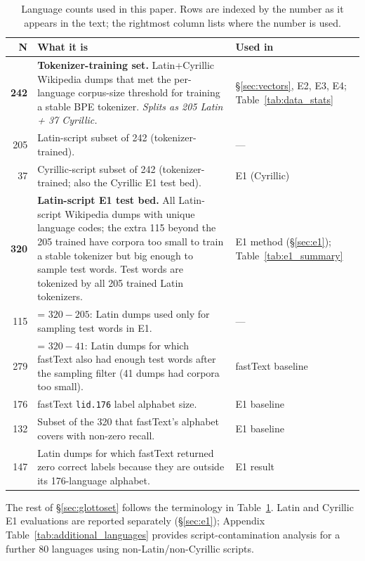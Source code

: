 \documentclass[11pt]{article}
\begin{document}
\begin{table}[ht]
\caption{Language counts used in this paper. Rows are indexed by the number as it appears in the text; the rightmost column lists where the number is used.}
\label{tab:language_counts}
\centering
\small
\renewcommand{\arraystretch}{1.15}
\begin{tabular}{@{}rp{5.2cm}l@{}}
\toprule
\textbf{N} & \textbf{What it is} & \textbf{Used in} \\
\midrule
\textbf{242} & \textbf{Tokenizer-training set.} Latin+Cyrillic Wikipedia dumps that met the per-language corpus-size threshold for training a stable BPE tokenizer. \emph{Splits as 205 Latin + 37 Cyrillic.} & \S\ref{sec:vectors}, E2, E3, E4; Table~\ref{tab:data_stats} \\
205 & Latin-script subset of 242 (tokenizer-trained). & — \\
37 & Cyrillic-script subset of 242 (tokenizer-trained; also the Cyrillic E1 test bed). & E1 (Cyrillic) \\
\textbf{320} & \textbf{Latin-script E1 test bed.} All Latin-script Wikipedia dumps with unique language codes; the extra 115 beyond the 205 trained have corpora too small to train a stable tokenizer but big enough to sample test words. Test words are tokenized by all 205 trained Latin tokenizers. & E1 method (\S\ref{sec:e1}); Table~\ref{tab:e1_summary} \\
115 & = $320-205$: Latin dumps used only for sampling test words in E1. & — \\
279 & = $320-41$: Latin dumps for which fastText also had enough test words after the sampling filter (41 dumps had corpora too small). & fastText baseline \\
176 & fastText \texttt{lid.176} label alphabet size. & E1 baseline \\
132 & Subset of the 320 that fastText's alphabet covers with non-zero recall. & E1 baseline \\
147 & Latin dumps for which fastText returned zero correct labels because they are outside its 176-language alphabet. & E1 result \\
\bottomrule
\end{tabular}
\end{table}

The rest of \S\ref{sec:glottoset} follows the terminology in Table~\ref{tab:language_counts}. Latin and Cyrillic E1 evaluations are reported separately (\S\ref{sec:e1}); Appendix Table~\ref{tab:additional_languages} provides script-contamination analysis for a further 80 languages using non-Latin/non-Cyrillic scripts.
\end{document}
